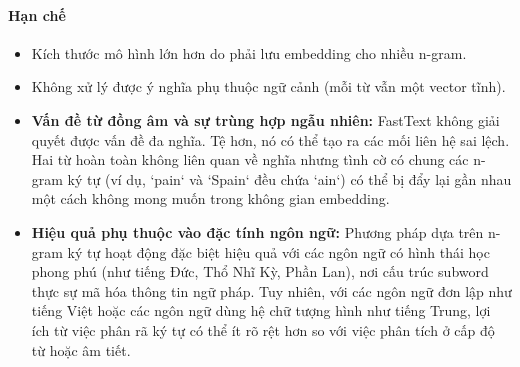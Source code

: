 \paragraph{Hạn chế}
\begin{itemize}
    \item Kích thước mô hình lớn hơn do phải lưu embedding cho nhiều n-gram.
    \item Không xử lý được ý nghĩa phụ thuộc ngữ cảnh (mỗi từ vẫn một vector tĩnh).
    \item \textbf{Vấn đề từ đồng âm và sự trùng hợp ngẫu nhiên:} FastText không giải quyết được vấn đề đa nghĩa. Tệ hơn, nó có thể tạo ra các mối liên hệ sai lệch. Hai từ hoàn toàn không liên quan về nghĩa nhưng tình cờ có chung các n-gram ký tự (ví dụ, `pain` và `Spain` đều chứa `ain`) có thể bị đẩy lại gần nhau một cách không mong muốn trong không gian embedding.

    \item \textbf{Hiệu quả phụ thuộc vào đặc tính ngôn ngữ:} Phương pháp dựa trên n-gram ký tự hoạt động đặc biệt hiệu quả với các ngôn ngữ có hình thái học phong phú (như tiếng Đức, Thổ Nhĩ Kỳ, Phần Lan), nơi cấu trúc subword thực sự mã hóa thông tin ngữ pháp. Tuy nhiên, với các ngôn ngữ đơn lập như tiếng Việt hoặc các ngôn ngữ dùng hệ chữ tượng hình như tiếng Trung, lợi ích từ việc phân rã ký tự có thể ít rõ rệt hơn so với việc phân tích ở cấp độ từ hoặc âm tiết.
\end{itemize}

